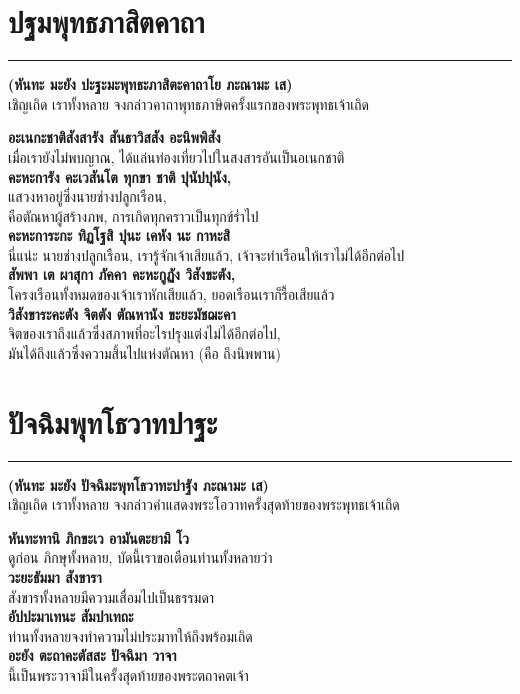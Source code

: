 \documentclass[12pt]{article}
\begin{document}
\pagebreak
\section{ปฐมพุทธภาสิตคาถา}
\hrule
\begin{center}
\textbf{(หันทะ มะยัง ปะฐะมะพุทธะภาสิตะคาถาโย ภะณามะ เส)}\\
เชิญเถิด เราทั้งหลาย จงกล่าวคาถาพุทธภาษิตครั้งแรกของพระพุทธเจ้าเถิด
\end{center}
\textbf{อะเนกะชาติสังสารัง สันธาวิสสัง อะนิพพิสัง}\\
\indent เมื่อเรายังไม่พบญาณ, ได้แล่นท่องเที่ยวไปในสงสารอันเป็นอเนกชาติ\\
\textbf{คะหะการัง คะเวสันโต ทุกขา ชาติ ปุนัปปุนัง,}\\
\indent แสวงหาอยู่ซึ่งนายช่างปลูกเรือน,\\
\indent คือตัณหาผู้สร้างภพ, การเกิดทุกคราวเป็นทุกข์ร่ำไป\\
\textbf{คะหะการะกะ ทิฏโฐสิ ปุนะ เคหัง นะ กาหะสิ}\\
\indent นี่แน่ะ นายช่างปลูกเรือน, เรารู้จักเจ้าเสียแล้ว, เจ้าจะทำเรือนให้เราไม่ได้อีกต่อไป\\
\textbf{สัพพา เต ผาสุกา ภัคคา คะหะกูฏัง วิสังขะตัง,}\\
\indent โครงเรือนทั้งหมดของเจ้าเราหักเสียแล้ว, ยอดเรือนเราก็รื้อเสียแล้ว\\
\textbf{วิสังขาระคะตัง จิตตัง ตัณหานัง ขะยะมัชฌะคา}\\
\indent จิตของเราถึงแล้วซึ่งสภาพที่อะไรปรุงแต่งไม่ได้อีกต่อไป,\\
\indent มันได้ถึงแล้วซึ่งความสิ้นไปแห่งตัณหา (คือ ถึงนิพพาน)\\

\pagebreak
\section{ปัจฉิมพุทโธวาทปาฐะ}
\hrule
\begin{center}
\textbf{(หันทะ มะยัง ปัจฉิมะพุทโธวาทะปาฐัง ภะณามะ เส)}\\
เชิญเถิด เราทั้งหลาย จงกล่าวคำแสดงพระโอวาทครั้งสุดท้ายของพระพุทธเจ้าเถิด
\end{center}
\textbf{หันทะทานิ ภิกขะเว อามันตะยามิ โว}\\
\indent ดูก่อน ภิกษุทั้งหลาย, บัดนี้เราขอเตือนท่านทั้งหลายว่า\\
\textbf{วะยะธัมมา สังขารา}\\
\indent สังขารทั้งหลายมีความเสื่อมไปเป็นธรรมดา\\
\textbf{อัปปะมาเทนะ สัมปาเทถะ}\\
\indent ท่านทั้งหลายจงทำความไม่ประมาทให้ถึงพร้อมเถิด\\
\textbf{อะยัง ตะถาคะตัสสะ ปัจฉิมา วาจา}\\
\indent นี้เป็นพระวาจามีในครั้งสุดท้ายของพระตถาคตเจ้า
\end{document}

